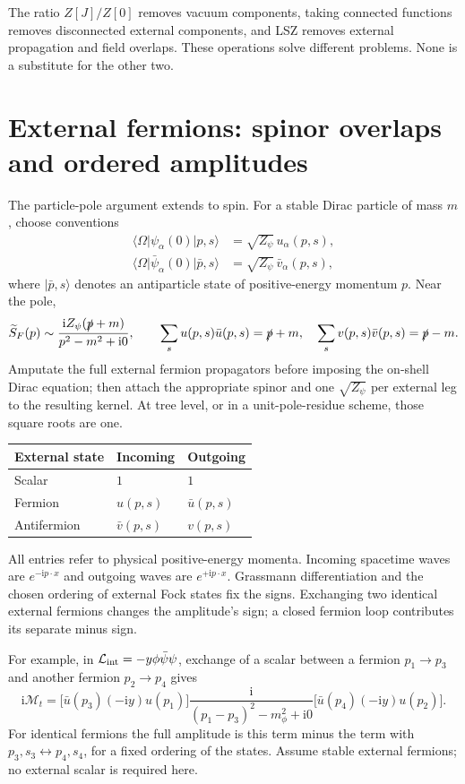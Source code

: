\documentclass[11pt]{article}
\newcommand{\ii}{\mathrm i}
\newcommand{\Lag}{\mathcal L}
\newcommand{\ket}[1]{\lvert#1\rangle}
\newcommand{\bra}[1]{\langle#1\rvert}
\newcommand{\module}[1]{\clearpage\section{#1}}
\newcommand{\cM}{\mathcal M}
\begin{document}
\begin{remarkbox}
The ratio \(Z[J]/Z[0]\) removes vacuum components, taking connected
functions removes disconnected external components, and LSZ removes
external propagation and field overlaps. These operations solve different
problems. None is a substitute for the other two.
\end{remarkbox}

\module{External fermions: spinor overlaps and ordered amplitudes}
The particle-pole argument extends to spin. For a stable Dirac particle
of mass \(m\), choose conventions
\begin{align}
 \bra{\Omega}\psi_\alpha(0)\ket{p,s}&=\sqrt{Z_\psi}\,u_\alpha(p,s),\\
 \bra{\Omega}\bar\psi_\alpha(0)\ket{\bar p,s}
 &=\sqrt{Z_\psi}\,\bar v_\alpha(p,s),
\end{align}
where \(\ket{\bar p,s}\) denotes an antiparticle state of positive-energy
momentum \(p\). Near the pole,
\begin{equation}
 \widetilde S_F(p)\sim\frac{\ii Z_\psi(\slashed p+m)}{p^2-m^2+\ii0},\qquad
 \sum_su(p,s)\bar u(p,s)=\slashed p+m,\quad
 \sum_sv(p,s)\bar v(p,s)=\slashed p-m.
\end{equation}
Amputate the full external fermion propagators before imposing the
on-shell Dirac equation; then attach the appropriate spinor and one
\(\sqrt{Z_\psi}\) per external leg to the resulting kernel.
At tree level, or in a unit-pole-residue scheme, those square roots are one.

\begin{center}
\begin{tabular}{lll}\toprule
External state & Incoming & Outgoing\\\midrule
Scalar & \(1\) & \(1\)\\
Fermion & \(u(p,s)\) & \(\bar u(p,s)\)\\
Antifermion & \(\bar v(p,s)\) & \(v(p,s)\)\\\bottomrule
\end{tabular}
\end{center}
All entries refer to physical positive-energy momenta. Incoming spacetime
waves are \(e^{-\ii p\cdot x}\) and outgoing waves are \(e^{+\ii p\cdot x}\).
Grassmann differentiation and the chosen ordering of external Fock states
fix the signs. Exchanging two identical external fermions changes the
amplitude's sign; a closed fermion loop contributes its separate minus sign.

For example, in \(\Lag_{\rm int}=-y\phi\bar\psi\psi\), exchange of a scalar
between a fermion \(p_1\to p_3\) and another fermion \(p_2\to p_4\) gives
\begin{equation}
 \ii\cM_t=\big[\bar u(p_3)(-\ii y)u(p_1)\big]
 \frac{\ii}{(p_1-p_3)^2-m_\phi^2+\ii0}
 \big[\bar u(p_4)(-\ii y)u(p_2)\big].
\end{equation}
For identical fermions the full amplitude is this term minus the term
with \(p_3,s_3\leftrightarrow p_4,s_4\), for a fixed ordering of the states.
Assume stable external fermions; no external scalar is required here.
\end{document}
